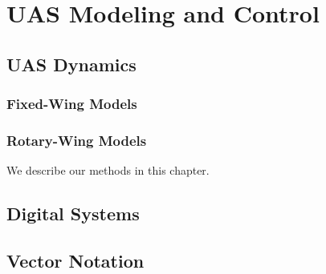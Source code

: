 \documentclass[
]{book}
\theoremstyle{definition}
\theoremstyle{definition}
\theoremstyle{definition}
\theoremstyle{remark}
\begin{document}
\hypertarget{part-uas-modeling-and-control}{%
\part{UAS Modeling and Control}\label{part-uas-modeling-and-control}}

\hypertarget{uas-dynamics}{%
\chapter{UAS Dynamics}\label{uas-dynamics}}

\hypertarget{fixed-wing-models}{%
\section{Fixed-Wing Models}\label{fixed-wing-models}}

\hypertarget{rotary-wing-models}{%
\section{Rotary-Wing Models}\label{rotary-wing-models}}

We describe our methods in this chapter.

\hypertarget{refs}{}

\hypertarget{appendix-appendix}{%
\appendix}


\hypertarget{digital-systems}{%
\chapter{Digital Systems}\label{digital-systems}}

\hypertarget{vector-notation}{%
\chapter{Vector Notation}\label{vector-notation}}

  
\end{document}
